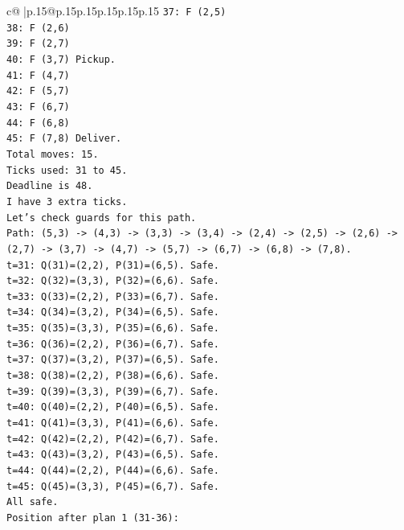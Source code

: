 \documentclass{article}
\begin{document}
{\begin{supertabular}{c@{$\;$}|p{.15\linewidth}@{}p{.15\linewidth}p{.15\linewidth}p{.15\linewidth}p{.15\linewidth}p{.15\linewidth}}
{{{\texttt{37: F (2,5)} \\
\texttt{38: F (2,6)} \\
\texttt{39: F (2,7)} \\
\texttt{40: F (3,7) Pickup.} \\
\texttt{41: F (4,7)} \\
\texttt{42: F (5,7)} \\
\texttt{43: F (6,7)} \\
\texttt{44: F (6,8)} \\
\texttt{45: F (7,8) Deliver.} \\
\texttt{Total moves: 15.} \\
\texttt{Ticks used: 31 to 45.} \\
\texttt{Deadline is 48.} \\
\texttt{I have 3 extra ticks.} \\
\texttt{Let's check guards for this path.} \\
\texttt{Path: (5,3) {-}> (4,3) {-}> (3,3) {-}> (3,4) {-}> (2,4) {-}> (2,5) {-}> (2,6) {-}> (2,7) {-}> (3,7) {-}> (4,7) {-}> (5,7) {-}> (6,7) {-}> (6,8) {-}> (7,8).} \\
\texttt{t=31: Q(31)=(2,2), P(31)=(6,5). Safe.} \\
\texttt{t=32: Q(32)=(3,3), P(32)=(6,6). Safe.} \\
\texttt{t=33: Q(33)=(2,2), P(33)=(6,7). Safe.} \\
\texttt{t=34: Q(34)=(3,2), P(34)=(6,5). Safe.} \\
\texttt{t=35: Q(35)=(3,3), P(35)=(6,6). Safe.} \\
\texttt{t=36: Q(36)=(2,2), P(36)=(6,7). Safe.} \\
\texttt{t=37: Q(37)=(3,2), P(37)=(6,5). Safe.} \\
\texttt{t=38: Q(38)=(2,2), P(38)=(6,6). Safe.} \\
\texttt{t=39: Q(39)=(3,3), P(39)=(6,7). Safe.} \\
\texttt{t=40: Q(40)=(2,2), P(40)=(6,5). Safe.} \\
\texttt{t=41: Q(41)=(3,3), P(41)=(6,6). Safe.} \\
\texttt{t=42: Q(42)=(2,2), P(42)=(6,7). Safe.} \\
\texttt{t=43: Q(43)=(3,2), P(43)=(6,5). Safe.} \\
\texttt{t=44: Q(44)=(2,2), P(44)=(6,6). Safe.} \\
\texttt{t=45: Q(45)=(3,3), P(45)=(6,7). Safe.} \\
\texttt{All safe.} \\
\texttt{Position after plan 1 (31{-}36):} \\
}}}
\end{supertabular}}
\end{document}
